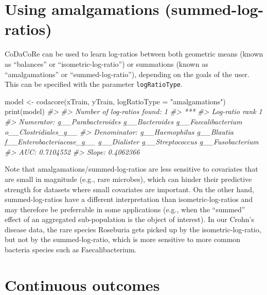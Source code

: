 \documentclass[
]{article}
\newenvironment{Shaded}{\begin{snugshade}}{\end{snugshade}}
\newcommand{\AttributeTok}[1]{\textcolor[rgb]{0.77,0.63,0.00}{#1}}
\newcommand{\CommentTok}[1]{\textcolor[rgb]{0.56,0.35,0.01}{\textit{#1}}}
\newcommand{\FunctionTok}[1]{\textcolor[rgb]{0.00,0.00,0.00}{#1}}
\newcommand{\NormalTok}[1]{#1}
\newcommand{\OtherTok}[1]{\textcolor[rgb]{0.56,0.35,0.01}{#1}}
\newcommand{\StringTok}[1]{\textcolor[rgb]{0.31,0.60,0.02}{#1}}
\begin{document}
\hypertarget{using-amalgamations-summed-log-ratios}{%
\section{Using amalgamations
(summed-log-ratios)}\label{using-amalgamations-summed-log-ratios}}

CoDaCoRe can be used to learn log-ratios between both geometric means
(known as ``balances'' or ``isometric-log-ratio'') or summations (known
as ``amalgamations'' or ``summed-log-ratio''), depending on the goals of
the user. This can be specified with the parameter
\texttt{logRatioType}.

\begin{Shaded}
\begin{Highlighting}[]
\NormalTok{model }\OtherTok{\textless{}{-}} \FunctionTok{codacore}\NormalTok{(xTrain, yTrain, }\AttributeTok{logRatioType =} \StringTok{"amalgamations"}\NormalTok{)}
\FunctionTok{print}\NormalTok{(model)}
\CommentTok{\#\textgreater{} }
\CommentTok{\#\textgreater{} Number of log{-}ratios found: 1}
\CommentTok{\#\textgreater{} ***}
\CommentTok{\#\textgreater{} Log{-}ratio rank 1}
\CommentTok{\#\textgreater{} Numerator: g\_\_Parabacteroides g\_\_Bacteroides g\_\_Faecalibacterium o\_\_Clostridiales\_g\_\_}
\CommentTok{\#\textgreater{} Denominator: g\_\_Haemophilus g\_\_Blautia f\_\_Enterobacteriaceae\_g\_\_ g\_\_Dialister g\_\_Streptococcus g\_\_Fusobacterium}
\CommentTok{\#\textgreater{} AUC: 0.7104552}
\CommentTok{\#\textgreater{} Slope: 0.4062366}
\end{Highlighting}
\end{Shaded}

Note that amalgamations/summed-log-ratios are less sensitive to
covariates that are small in magnitude (e.g., rare microbes), which can
hinder their predictive strength for datasets where small covariates are
important. On the other hand, summed-log-ratios have a different
interpretation than isometric-log-ratios and may therefore be
preferrable in some applications (e.g., when the ``summed'' effect of an
aggregated sub-population is the object of interest). In our Crohn's
disease data, the rare species Roseburia gets picked up by the
isometric-log-ratio, but not by the summed-log-ratio, which is more
sensitive to more common bacteria species such as Faecalibacterium.

\hypertarget{continuous-outcomes}{%
\section{Continuous outcomes}\label{continuous-outcomes}}
\end{document}
